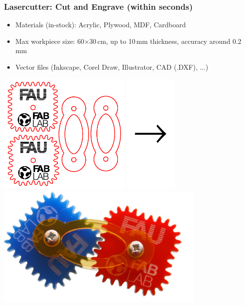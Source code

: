 \documentclass[t]{beamer}
\begin{document}
\begin{frame}
    \frametitle{Lasercutter: Cut and Engrave (within seconds)}
    \begin{itemize}
        \item Materials (in-stock): Acrylic, Plywood, MDF, Cardboard
        \item Max workpiece size: 60$\times$30\,cm, up to 10\,mm thickness, accuracy around 0.2\,mm
        \item Vector files (Inkscape, Corel Draw, Illustrator, CAD (.DXF), ...)
    \end{itemize}

    \bigskip

    \bigskip
    \begin{center}
        \includegraphics[height=6cm]{../img/SquareGears.pdf}
        \includegraphics[height=6cm]{../img/pfeil.pdf}
        \includegraphics[height=6cm]{../img/zahnraeder2b-skaliert.png}
    \end{center}

\end{frame}
\end{document}
